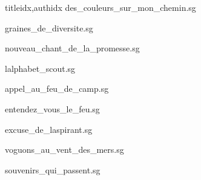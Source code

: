 \documentclass[12pt]{article}
\begin{document}
\begin{songs}{titleidx,authidx}
{des_couleurs_sur_mon_chemin.sg}


{graines_de_diversite.sg}


{nouveau_chant_de_la_promesse.sg}


{lalphabet_scout.sg}


{appel_au_feu_de_camp.sg}


{entendez_vous_le_feu.sg}


{excuse_de_laspirant.sg}


{voguons_au_vent_des_mers.sg}


{souvenirs_qui_passent.sg}


\end{songs}
\end{document}
